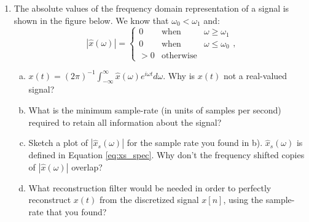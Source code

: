 \begin{enumerate}
  \item The absolute values of the frequency domain representation of a signal is 
        shown in the figure below. We know that $\omega_{0}<\omega_{1}$ and:
        \begin{equation}
          |\hat{x}(\omega)| = \left\{\begin{array}{ccc}
            0  & \mathrm{when}      & \omega \ge \omega_1 \\
            0  & \mathrm{when}      & \omega \le \omega_0 \\
            >0 & \mathrm{otherwise} &
          \end{array}\right.,
        \end{equation}
        \begin{center}
        \end{center}
        \begin{enumerate}[a)]
          \item $x(t)=(2\pi)^{-1}\int_{-\infty}^{\infty}\hat{x}(\omega)e^{i\omega t}d\omega$. 
                Why is $x(t)$ not a real-valued signal?
          \item What is the minimum sample-rate (in units of samples per second) required 
                to retain all information about the signal?
          \item Sketch a plot of $|\hat{x}_s(\omega)|$ for the sample rate you found 
                in b). $\hat{x}_s(\omega)$ is defined in Equation \ref{eq:xs_spec}. 
                Why don't the frequency shifted copies of $|\hat{x}(\omega)|$ overlap?
          \item What reconstruction filter would be needed in order to perfectly 
                reconstruct $x(t)$ from the discretized signal $x[n]$, 
                using the sample-rate that you found?
        \end{enumerate}


\end{enumerate}
